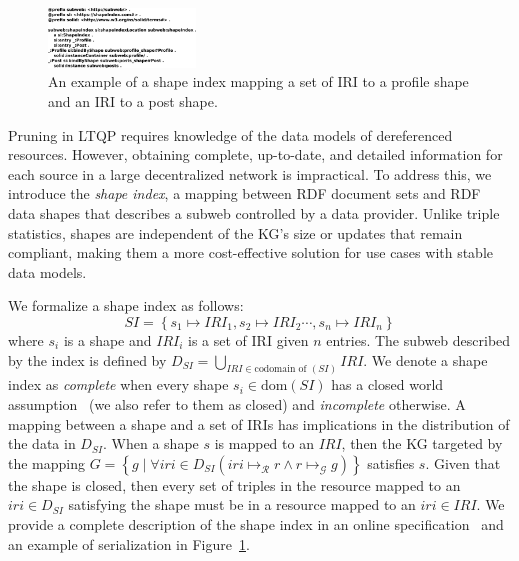 \begin{figure}
   \centering
   \includegraphics[width=0.35\textwidth]{figure/shapeIndex.pdf}

   \caption{An example of a shape index mapping a set of IRI to a profile shape and an IRI to a post shape.}
   \label{fig:shapeIndex}
\end{figure}

Pruning in LTQP requires knowledge of the data models of dereferenced resources.  
However, obtaining complete, up-to-date, and detailed information for each source in a large decentralized network is impractical.  
To address this, we introduce the \emph{shape index}, a mapping between RDF document sets and RDF data shapes that describes a subweb controlled by a data provider.  
Unlike triple statistics, shapes are independent of the KG's size or updates that remain compliant, making them a more cost-effective solution for use cases with stable data models. 

We formalize a shape index as follows:
\begin{equation}\label{eq:shapeIndex}
   SI = \left\{ s_1 \mapsto IRI_1, s_2 \mapsto IRI_2 \cdots, s_n \mapsto IRI_n \right\}
\end{equation}
where $s_i$ is a shape and $IRI_i$ is a set of IRI given $n$ entries.
The subweb described by the index is defined by $D_{SI} = \bigcup_{IRI \in \text{codomain of }(SI)} IRI$.
We denote a shape index as \emph{complete} when every shape $s_i \in \text{dom}(SI)$ has a closed world assumption~\cite{Gayo2018b, Gayo2018} (we also refer to them as closed) and \emph{incomplete} otherwise.
A mapping between a shape and a set of IRIs has implications in the distribution of the data in $D_{SI}$.
When a shape $s$ is mapped to an $IRI$, then the KG targeted by the mapping $G = \left\{ g \mid \forall iri \in D_{SI} (iri \mapsto_{\mathcal{R}} r \land r \mapsto_{\mathcal{G}} g) \right\}$ satisfies $s$.
Given that the shape is closed, then every set of triples in the resource mapped to an $iri \in D_{SI}$ satisfying the shape must be in a resource mapped to an $iri \in IRI$.
We provide a complete description of the shape index in an online specification~ and an example of serialization in Figure~\ref{fig:shapeIndex}.

